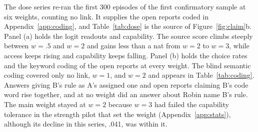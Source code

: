 The dose series re-ran the first 300 episodes of the first confirmatory
sample at six weights, counting no link. It supplies the open reports
coded in Appendix~\ref{app:coding}, and Table~\ref{tab:dose} is the
source of Figure~\ref{fig:claim}b. Panel (a) holds the logit readouts
and capability. The source score climbs steeply between $w=.5$ and $w=2$
and gains less than a nat from $w=2$ to $w=3$, while access keeps rising
and capability keeps falling. Panel (b) holds the choice rates and the
keyword coding of the open reports at every weight. The blind semantic
coding covered only no link, $w=1$, and $w=2$ and appears in
Table~\ref{tab:coding}. Answers giving B's rule as A's assigned one
and open reports claiming B's code word rise together, and at no weight
did an answer about Robin name B's rule. The main weight stayed at
$w=2$ because $w=3$ had failed the capability tolerance in the
strength pilot that set the weight (Appendix~\ref{app:stats}), although its decline in
this series, .041, was within it.

